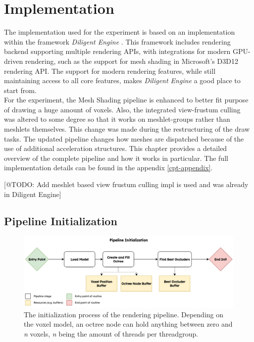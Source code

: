 \chapter{Implementation} \label{cpt-implementation}

The implementation used for the experiment is based on an implementation within the framework \emph{Diligent Engine} 
\cite{DiligentGraphicsGitHub, DiligentGraphics}. This framework includes rendering backend supporting 
multiple rendering \ac{API}s, with integrations for modern \ac{GPU}-driven rendering, such as the support for 
mesh shading in Microsoft's D3D12 rendering \ac{API}. The support for modern rendering features, while still 
maintaining access to all core features, makes \emph{Diligent Engine} a good place to start from.\\

\noindent
For the experiment, the Mesh Shading pipeline is enhanced to better fit purpose of drawing a huge amount of voxels. 
Also, the integrated view-frustum culling was altered to some degree so that it works on meshlet-groups rather 
than meshlets themselves. This change was made during the restructuring of the draw tasks. The updated pipeline 
changes how meshes are dispatched because of the use of additional acceleration structures. This chapter provides 
a detailed overview of the complete pipeline and how it works in particular. The full implementation details can be 
found in the appendix \ref{cpt-appendix}.

[@TODO: Add meshlet based view frustum culling impl is used and was already in Diligent Engine]

\section{Pipeline Initialization} \label{sec-piepline-initialization}

\begin{figure}[h]
    \centering
    \includegraphics[width=\linewidth]{images/graphics/pipeline-initialization.jpg}
    \caption{The initialization process of the rendering pipeline. Depending on the voxel model, an octree node 
    can hold anything between zero and \emph{n} voxels, \emph{n} being the amount of threads per threadgroup.}
    \label{fig:pipeline-initialization}
\end{figure}

